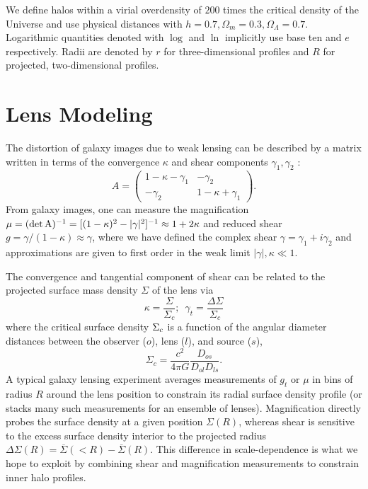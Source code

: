 \documentclass[12pt]{emulateapj}
\begin{document}
We define halos within a virial overdensity of $200$ times the
critical density of the Universe and use physical distances with
$h=0.7, \Omega_m=0.3, \Omega_\Lambda=0.7$. Logarithmic quantities
denoted with $\log$ and $\ln$ implicitly use base ten and $e$
respectively. Radii are denoted by $r$ for three-dimensional profiles
and $R$ for projected, two-dimensional profiles.

\section{Lens Modeling}
\label{sec:model}

The distortion of galaxy images due to weak lensing can be described
by a matrix written in terms of the convergence $\kappa$ and shear
components $\gamma_1, \gamma_2$ \citep[e.g.][]{Bartelmann2001}:
\begin{equation}
A = \left( \begin{array}{cc}
1 - \kappa -\gamma_1 & -\gamma_2 \\
-\gamma_2 & 1 - \kappa + \gamma_1 \end{array} \right).
\end{equation}
From galaxy images, one can measure the magnification 
$\mu = (\rm{det}\,A)^{-1} = [(1-\kappa)^2 - |\gamma|^2]^{-1} \approx 1+2\kappa$
and reduced shear $g = \gamma / (1-\kappa) \approx \gamma$, where we have defined the
complex shear $\gamma=\gamma_1 + i\gamma_2$ and approximations are
given to first order in the weak limit $|\gamma|,\kappa \ll 1$.

The convergence and tangential component of shear can be related to the
projected surface mass density $\Sigma$ of the lens via
\begin{equation}
\kappa = \frac{\Sigma}{\Sigma_c}; \,\,\, \gamma_t = \frac{\Delta\Sigma}{\Sigma_c}
\end{equation}
where the critical surface density $\Sigma_{\rm  c}$ is a function of
the angular diameter distances between the observer ($o$), lens ($l$),
and source ($s$),
\begin{equation}
\Sigma_{c}=\frac{c^2}{4\pi G}\frac{D_{os}}{D_{ol}D_{ls}}.
\end{equation}
A typical galaxy lensing experiment averages measurements of $g_t$ or $\mu$ in
bins of radius $R$ around the lens position to constrain its radial
surface density profile (or stacks many such measurements for an
ensemble of lenses). Magnification directly probes the surface density
at a given position $\Sigma(R)$, whereas shear is sensitive to the
excess surface density interior to the projected radius
$\Delta\Sigma(R) = \overline{\Sigma}(<R) - \overline{\Sigma}(R)$. This
difference in scale-dependence is what we hope to exploit by combining
shear and magnification measurements to constrain inner halo profiles.
\end{document}
